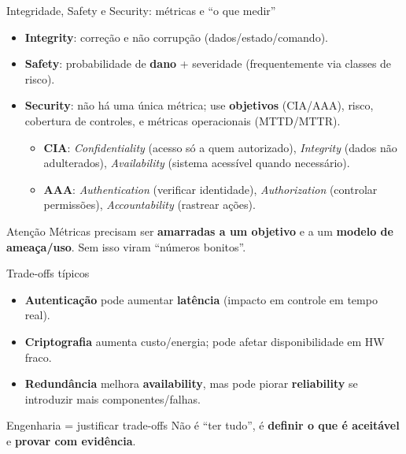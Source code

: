 \documentclass{beamer}
\begin{document}
\begin{frame}{Integridade, Safety e Security: métricas e “o que medir”}
\begin{itemize}
  \item \textbf{Integrity}: correção e não corrupção (dados/estado/comando).
  \item \textbf{Safety}: probabilidade de \textbf{dano} + severidade (frequentemente via classes de risco).
  \item \textbf{Security}: não há uma única métrica; use \textbf{objetivos} (CIA/AAA), risco, cobertura de controles, e métricas operacionais (MTTD/MTTR).
  \begin{itemize}
    \item \textbf{CIA}: \textit{Confidentiality} (acesso só a quem autorizado), \textit{Integrity} (dados não adulterados), \textit{Availability} (sistema acessível quando necessário).
    \item \textbf{AAA}: \textit{Authentication} (verificar identidade), \textit{Authorization} (controlar permissões), \textit{Accountability} (rastrear ações).
  \end{itemize}
\end{itemize}

\vspace{0.3em}
\begin{block}{Atenção}
Métricas precisam ser \textbf{amarradas a um objetivo} e a um \textbf{modelo de ameaça/uso}. Sem isso viram ``números bonitos''.
\end{block}
\end{frame}

\begin{frame}{Trade-offs típicos}
\begin{itemize}
  \item \textbf{Autenticação} pode aumentar \textbf{latência} (impacto em controle em tempo real).
  \item \textbf{Criptografia} aumenta custo/energia; pode afetar disponibilidade em HW fraco.
  \item \textbf{Redundância} melhora \textbf{availability}, mas pode piorar \textbf{reliability} se introduzir mais componentes/falhas.
\end{itemize}

\begin{block}{Engenharia = justificar trade-offs}
Não é “ter tudo”, é \textbf{definir o que é aceitável} e \textbf{provar com evidência}.
\end{block}
\end{frame}
\end{document}
